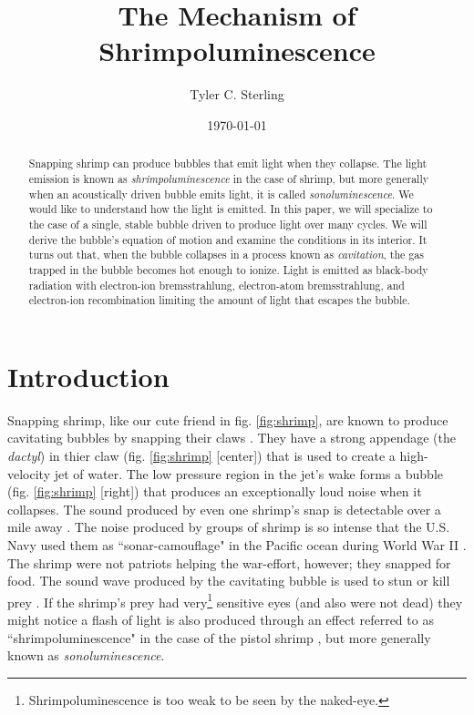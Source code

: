 \documentclass[prb,aps,nofootinbib,superscriptaddress,floatfix]{revtex4-2}
\begin{document}
\title{The Mechanism of Shrimpoluminescence}

\author{Tyler C. Sterling}

\date{\today}

\begin{abstract}
Snapping shrimp can produce bubbles that emit light when they collapse. The light emission is known as \emph{shrimpoluminescence} in the case of shrimp, but more generally when an acoustically driven bubble emits light, it is called \emph{sonoluminescence}. We would like to understand how the light is emitted. In this paper, we will specialize to the case of a single, stable bubble driven to produce light over many cycles. We will derive the bubble's equation of motion and examine the conditions in its interior. It turns out that, when the bubble collapses in a process known as \emph{cavitation}, the gas trapped in the bubble becomes hot enough to ionize. Light is emitted as black-body radiation with electron-ion bremsstrahlung, electron-atom bremsstrahlung, and electron-ion recombination limiting the amount of light that escapes the bubble.
\end{abstract}

\maketitle

\section{Introduction}
Snapping shrimp, like our cute friend in fig. \ref{fig:shrimp}, are known to produce cavitating bubbles by snapping their claws \cite{versluis2000snapping,lohse2001snapping,tang2019bioinspired}. They have a strong appendage (the \emph{dactyl}) in thier claw (fig. \ref{fig:shrimp} [center]) that is used to create a high-velocity jet of water. The low pressure region in the jet's wake forms a bubble (fig. \ref{fig:shrimp} [right]) that produces an exceptionally loud noise when it collapses. The sound produced by even one shrimp's snap is detectable over a mile away \cite{everest1948acoustical}. The noise produced by groups of shrimp is so intense that the U.S. Navy used them as ``sonar-camouflage" in the Pacific ocean during World War II \cite{versluis2000snapping}. The shrimp were not patriots helping the war-effort, however; they snapped for food. The sound wave produced by the cavitating bubble is used to stun or kill prey \cite{versluis2000snapping}. If the shrimp's prey had very\footnote{Shrimpoluminescence is too weak to be seen by the naked-eye.} sensitive eyes (and also were not dead) they might notice a flash of light is also produced through an effect referred to as ``shrimpoluminescence" in the case of the pistol shrimp \cite{lohse2001snapping}, but more generally known as \emph{sonoluminescence}.
\end{document}
